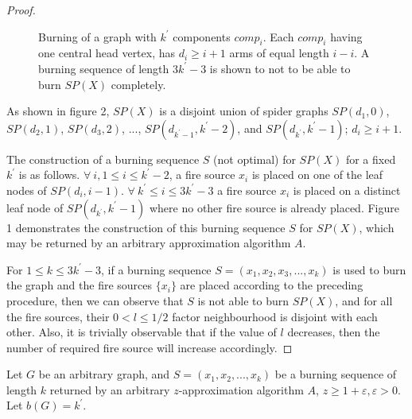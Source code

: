 \begin{proof}
\begin{figure}
\begin{minipage}{1\textwidth}
	\end{minipage}
	
	\caption{Burning of a graph with $k^{\prime}$ components $comp_i$. Each $comp_i$ having one central head vertex, has $d_i \geq i+1$ arms of equal length $i-i$. A burning sequence of length $3 k^{\prime}-3$ is shown to not to be able to burn $SP(X)$ completely.}
\end{figure}

As shown in figure 2, $SP(X)$ is a disjoint union of spider graphs $SP(d_1, 0)$, $SP(d_2, 1)$, $SP(d_3, 2)$, $. . .$, $SP(d_{k^{\prime}-1}, k^{\prime}-2)$, and $SP(d_{k^{\prime}}, k^{\prime}-1)$; $d_i \geq i+1$.

The construction of a burning sequence $S$ (not optimal) for $SP(X)$ for a fixed $k^{\prime}$ is as follows. $\forall\ i, 1 \leq i \leq k^{\prime}-2$, a fire source $x_i$ is placed on one of the leaf nodes of $SP(d_i, i-1)$. $\forall\ k^{\prime} \leq i \leq 3k^{\prime}-3$ a fire source $x_i$ is placed on a distinct leaf node of $SP(d_{k^{\prime}}, k^{\prime}-1)$ where no other fire source is already placed. Figure 1 demonstrates the construction of this burning sequence $S$ for $SP(X)$, which may be returned by an arbitrary approximation algorithm $A$.

For $1 \leq k \leq 3 k^{\prime}-3$, if a burning sequence $S=(x_1, x_2, x_3, . . ., x_k)$ is used to burn the graph and the fire sources $\{x_i\}$ are placed according to the preceding procedure, then we can observe that $S$ is not able to burn $SP(X)$, and for all the fire sources, their $0 < l \leq 1/2$ factor neighbourhood is disjoint with each other. Also, it is trivially observable that if the value of $l$ decreases, then the number of required fire source will increase accordingly.
\end{proof}

Let $G$ be an arbitrary graph, and $S = (x_1, x_2, . . ., x_k)$ be a burning sequence of length $k$ returned by an arbitrary $z$-approximation algorithm $A$, $z \geq 1+\varepsilon, \varepsilon > 0$. Let $b(G) = k^{\prime}$.

